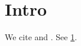 \documentclass{article}
\begin{document}
\section{Intro}\label{sec:intro}
We cite \cite{refA} and \cite{refB}. See \ref{sec:intro}.


\end{document}
